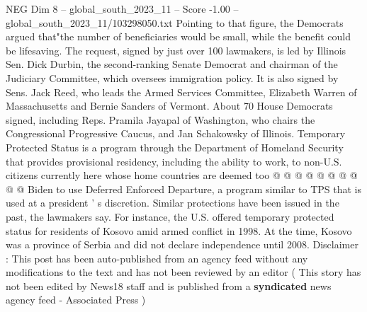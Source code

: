 \begin{textsample}{NEG Dim 8 – global\_south\_2023\_11 – Score -1.00 – global\_south\_2023\_11/103298050.txt}
Pointing to that figure, the Democrats argued that"the number of beneficiaries would be small, while the benefit could be lifesaving.
The request, signed by just over 100 lawmakers, is led by Illinois Sen.
Dick Durbin, the second-ranking Senate Democrat and chairman of the Judiciary Committee, which oversees immigration policy.
It is also signed by Sens.
Jack Reed, who leads the Armed Services Committee, Elizabeth Warren of Massachusetts and Bernie Sanders of Vermont.
About 70 House Democrats signed, including Reps.
Pramila Jayapal of Washington, who chairs the Congressional Progressive Caucus, and Jan Schakowsky of Illinois.
Temporary Protected Status is a program through the Department of Homeland Security that provides provisional residency, including the ability to work, to non-U.S. citizens currently here whose home countries are deemed too @ @ @ @ @ @ @ @ @ @ Biden to use Deferred Enforced Departure, a program similar to TPS that is used at a president ' s discretion.
Similar protections have been issued in the past, the lawmakers say.
For instance, the U.S. offered temporary protected status for residents of Kosovo amid armed conflict in 1998.
At the time, Kosovo was a province of Serbia and did not declare independence until 2008.
Disclaimer : This post has been auto-published from an agency feed without any modifications to the text and has not been reviewed by an editor ( This story has not been edited by News18 staff and is published from a \textbf{syndicated} news agency feed - Associated Press )

\end{textsample}

